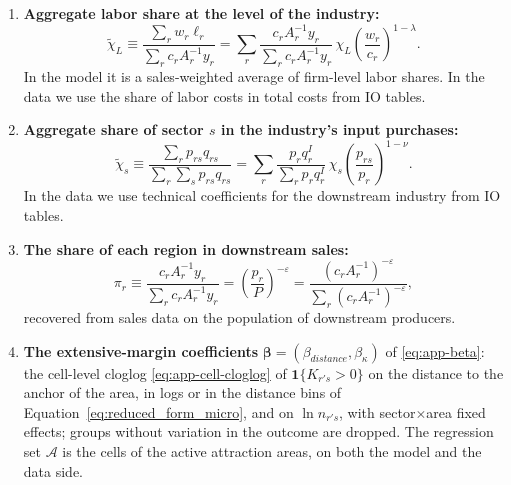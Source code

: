 \begin{enumerate}
    \item \textbf{Aggregate labor share at the level of the industry:}
    \begin{equation}
    \tilde\chi_{L}\equiv\frac{\sum_{r}w_{r}\ell_{r}}{\sum_{r}c_{r}A_{r}^{-1}y_{r}}
    =\sum_{r}\frac{c_{r}A_{r}^{-1}y_{r}}{\sum_{r}c_{r}A_{r}^{-1}y_{r}}\,\chi_{L}
    \left(\frac{w_{r}}{c_{r}}\right)^{1-\lambda}.
    \end{equation}
    In the model it is a sales-weighted average of firm-level labor shares. In the data we use the     share of labor costs in total costs from IO tables.
    
    \item \textbf{Aggregate share of sector $s$ in the industry's input purchases:}
    \begin{equation}
    \tilde\chi_{s}\equiv\frac{\sum_{r}p_{rs}q_{rs}}{\sum_{r}\sum_{s}p_{rs}q_{rs}}
    =\sum_{r}\frac{p_{r}q^{I}_{r}}{\sum_{r}p_{r}q^{I}_{r}}\,\chi_{s}
    \left(\frac{p_{rs}}{p_{r}}\right)^{1-\nu}.
    \end{equation}
    In the data we use technical coefficients for the downstream industry from IO tables.
    
    \item \textbf{The share of each region in downstream sales:}
    \begin{equation}
    \pi_{r}\equiv\frac{c_{r}A_{r}^{-1}y_{r}}{\sum_{r}c_{r}A_{r}^{-1}y_{r}}     =\left(\frac{p_{r}}{P}\right)^{-\varepsilon}     =\frac{(c_{r}A_{r}^{-1})^{-\varepsilon}}{\sum_{r}(c_{r}A_{r}^{-1})^{-\varepsilon}},
    \end{equation}
    recovered from sales data on the population of downstream producers.
    
    \item \textbf{The extensive-margin coefficients} $\boldsymbol\beta=(\beta_{distance},\beta_{\kappa})$ of \eqref{eq:app-beta}: the cell-level cloglog \eqref{eq:app-cell-cloglog} of $\mathbf{1}\{K_{r's}>0\}$ on the distance to the anchor of the area, in logs or in the distance bins of Equation~\eqref{eq:reduced_form_micro}, and on $\ln n_{r's}$, with sector$\times$area fixed effects; groups without variation in the outcome are dropped. The regression set $\mathcal{A}$ is the cells of the active attraction areas, on both the model and the data side.
    

\end{enumerate}
